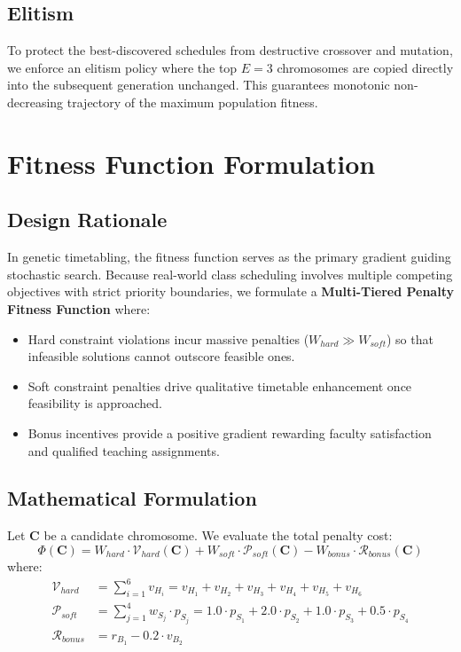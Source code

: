 \documentclass[12pt,a4paper]{report}
\begin{document}
\section{Elitism}
To protect the best-discovered schedules from destructive crossover and mutation, we enforce an elitism policy where the top $E = 3$ chromosomes are copied directly into the subsequent generation unchanged. This guarantees monotonic non-decreasing trajectory of the maximum population fitness.

\chapter{Fitness Function Formulation}

\section{Design Rationale}
In genetic timetabling, the fitness function serves as the primary gradient guiding stochastic search. Because real-world class scheduling involves multiple competing objectives with strict priority boundaries, we formulate a \textbf{Multi-Tiered Penalty Fitness Function} where:
\begin{itemize}[leftmargin=1.5em]
  \item Hard constraint violations incur massive penalties ($W_{hard} \gg W_{soft}$) so that infeasible solutions cannot outscore feasible ones.
  \item Soft constraint penalties drive qualitative timetable enhancement once feasibility is approached.
  \item Bonus incentives provide a positive gradient rewarding faculty satisfaction and qualified teaching assignments.
\end{itemize}

\section{Mathematical Formulation}
Let $\mathbf{C}$ be a candidate chromosome. We evaluate the total penalty cost:
\begin{equation}
  \Phi(\mathbf{C}) = W_{hard} \cdot \mathcal{V}_{hard}(\mathbf{C}) + W_{soft} \cdot \mathcal{P}_{soft}(\mathbf{C}) - W_{bonus} \cdot \mathcal{R}_{bonus}(\mathbf{C})
\end{equation}
where:
\begin{align}
  \mathcal{V}_{hard} &= \sum_{i=1}^{6} v_{H_i} = v_{H_1} + v_{H_2} + v_{H_3} + v_{H_4} + v_{H_5} + v_{H_6} \\
  \mathcal{P}_{soft} &= \sum_{j=1}^{4} w_{S_j} \cdot p_{S_j} = 1.0 \cdot p_{S_1} + 2.0 \cdot p_{S_2} + 1.0 \cdot p_{S_3} + 0.5 \cdot p_{S_4} \\
  \mathcal{R}_{bonus} &= r_{B_1} - 0.2 \cdot v_{B_2}
\end{align}
\end{document}
